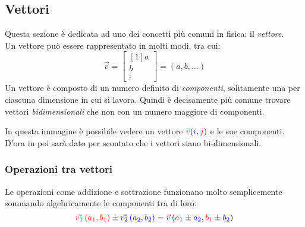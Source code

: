 \subsection{Vettori}
Questa sezione è dedicata ad uno dei concetti più comuni in fisica: il \emph{vettore}.\\
Un vettore può essere rappresentato in molti modi, tra cui:
\begin{equation*}
  \vec{v} = 
  \begin{bmatrix}[1]
    a\\b\\\vdots
  \end{bmatrix} = 
  (a, b, \dots)
\end{equation*}
Un vettore è composto di un numero definito di \emph{componenti}, solitamente una per ciascuna
dimensione in cui si lavora. Quindi è decisamente più comune trovare vettori \emph{bidimensionali}
che non con un numero maggiore di componenti.\\
\begin{center}
\end{center}
In questa immagine è possibile vedere un vettore $\mathcolor{cyan}{\vec{v}}(\mathcolor{blue}{i},
\mathcolor{red}{j})$ e le sue componenti.\\[\baselineskip]
D'ora in poi sarà dato per scontato che i vettori siano bi-dimensionali.

\subsubsection{Operazioni tra vettori}
Le operazioni come addizione e sottrazione funzionano molto semplicemente sommando algebricamente
le componenti tra di loro:
\begin{equation*}
  \mathcolor{red}{\vec{v_1}\left(a_1, b_1\right)} \pm 
  \mathcolor{blue}{\vec{v_2}\left(a_2, b_2\right)} = 
  \mathcolor{purple}{\vec{v}}\left(\mathcolor{red}{a_1}\pm \mathcolor{blue}{a_2}, 
  \mathcolor{red}{b_1}\pm \mathcolor{blue}{b_2}\right)
\end{equation*}

